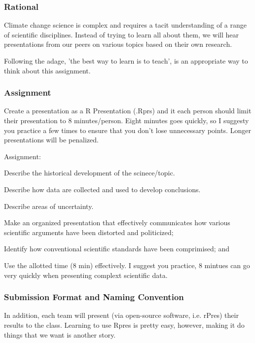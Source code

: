 
\subsubsection{Rational}

Climate change science is complex and requires a tacit understanding of a range of scientific disciplines. Instead of trying to learn all about them, we will hear presentations from our peers on various topics based on their own research. 

Following the adage, 'the best way to learn is to teach', is an appropriate way to think about this assignment. 

\subsubsection{Assignment}

Create a presentation as a R Presentation (.Rprs) and it each person should limit their presentation to 8 minutes/person. Eight minutes goes quickly, so I suggesty you practice a few times to ensure that you don't lose unnecessary points. Longer presentations will be penalized.  

\noindent Assignment: 
\begin{itemize*}
  \item Describe the historical development of the scinece/topic.
  \item Describe how data are collected and used to develop conclusions.
  \item Describe areas of uncertainty.
  \item Make an organized presentation that effectively communicates how various scientific arguments have been distorted and politicized;
  \item Identify how conventional scientific standards have been comprimised; and
  \item Use the allotted time (8 min) effectively. I suggest you practice, 8 mintues can go very quickly when presenting complext scientific data.
\end{itemize*}

\subsubsection{Submission Format and Naming Convention}

In addition, each team will present (via open-source software, i.e. rPres) their results to the class. Learning to use Rpres is pretty easy, however, making it do things that we want is another story. 

